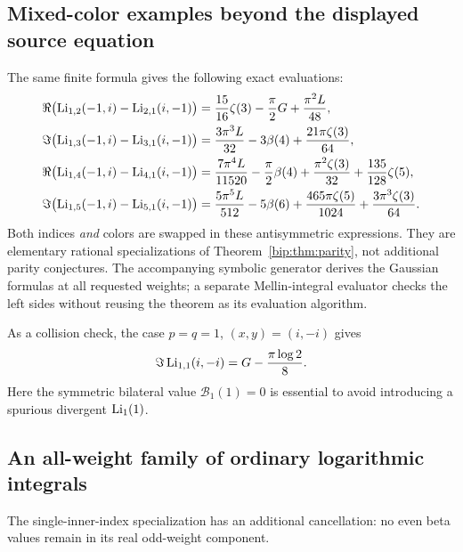 \subsection{Mixed-color examples beyond the displayed source equation}
The same finite formula gives the following exact evaluations:
\begin{align}
 \Re\bigl(\operatorname{Li}_{1,2}(-1,i)-\operatorname{Li}_{2,1}(i,-1)\bigr)
   &=\frac{15}{16}\zeta(3)-\frac\pi2G+\frac{\pi^2L}{48},
       \label{bip:eq:mix3}\\
 \Im\bigl(\operatorname{Li}_{1,3}(-1,i)-\operatorname{Li}_{3,1}(i,-1)\bigr)
   &=\frac{3\pi^3L}{32}-3\beta(4)+\frac{21\pi\zeta(3)}{64},
       \label{bip:eq:mix4}\\
 \Re\bigl(\operatorname{Li}_{1,4}(-1,i)-\operatorname{Li}_{4,1}(i,-1)\bigr)
   &=\frac{7\pi^4L}{11520}-\frac\pi2\beta(4)
          +\frac{\pi^2\zeta(3)}{32}+\frac{135}{128}\zeta(5),
       \label{bip:eq:mix5}\\
 \Im\bigl(\operatorname{Li}_{1,5}(-1,i)-\operatorname{Li}_{5,1}(i,-1)\bigr)
   &=\frac{5\pi^5L}{512}-5\beta(6)
          +\frac{465\pi\zeta(5)}{1024}
          +\frac{3\pi^3\zeta(3)}{64}.
       \label{bip:eq:mix6}
\end{align}
Both indices \emph{and} colors are swapped in these antisymmetric
expressions. They are elementary rational specializations of
Theorem~\ref{bip:thm:parity}, not additional parity conjectures.
The accompanying symbolic generator derives the Gaussian formulas at
all requested weights; a separate Mellin-integral evaluator checks the
left sides without reusing the theorem as its evaluation algorithm.

As a collision check, the case $p=q=1$, $(x,y)=(i,-i)$ gives
\[
 \Im\operatorname{Li}_{1,1}(i,-i)=G-\frac{\pi\log2}{8}.
\]
Here the symmetric bilateral value $\mathcal B_1(1)=0$ is essential to
avoid introducing a spurious divergent $\operatorname{Li}_1(1)$.


\subsection{An all-weight family of ordinary logarithmic integrals}
The single-inner-index specialization has an additional cancellation:
no even beta values remain in its real odd-weight component.

